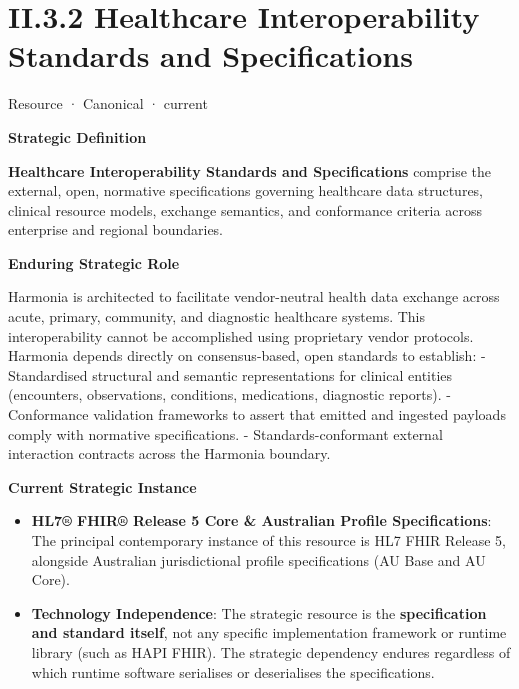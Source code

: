 \section*{II.3.2 Healthcare Interoperability Standards and Specifications}
\label{navigation:II.3.2}

\label{element:4d725c804fb34dfa90486b21118bab8e}
{\small Resource · Canonical · current}\par

\par\medskip\textbf{Strategic Definition}\par


\textbf{Healthcare Interoperability Standards and Specifications} comprise the external, open, normative specifications governing healthcare data structures, clinical resource models, exchange semantics, and conformance criteria across enterprise and regional boundaries.



\par\medskip\textbf{Enduring Strategic Role}\par


Harmonia is architected to facilitate vendor-neutral health data exchange across acute, primary, community, and diagnostic healthcare systems. This interoperability cannot be accomplished using proprietary vendor protocols. Harmonia depends directly on consensus-based, open standards to establish:
- Standardised structural and semantic representations for clinical entities (encounters, observations, conditions, medications, diagnostic reports).
- Conformance validation frameworks to assert that emitted and ingested payloads comply with normative specifications.
- Standards-conformant external interaction contracts across the Harmonia boundary.



\par\medskip\textbf{Current Strategic Instance}\par


\begin{itemize}


\item \textbf{HL7® FHIR® Release 5 Core \& Australian Profile Specifications}: The principal contemporary instance of this resource is HL7 FHIR Release 5, alongside Australian jurisdictional profile specifications (AU Base and AU Core).

\item \textbf{Technology Independence}: The strategic resource is the \textbf{specification and standard itself}, not any specific implementation framework or runtime library (such as HAPI FHIR). The strategic dependency endures regardless of which runtime software serialises or deserialises the specifications.

\end{itemize}


